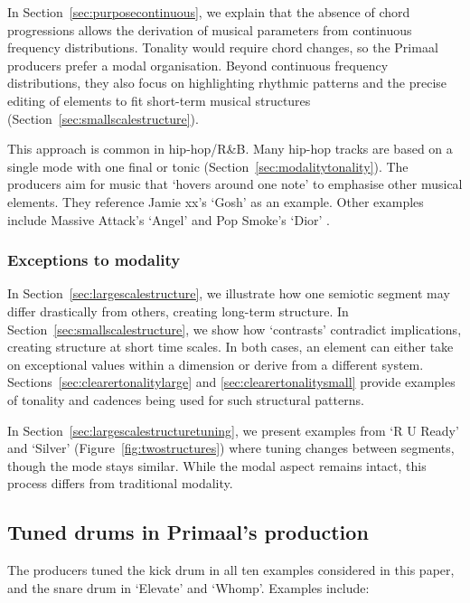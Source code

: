 \documentclass{article}
\begin{document}
In Section~\ref{sec:purposecontinuous}, we explain that the absence of chord progressions allows the derivation of musical parameters from continuous frequency distributions. Tonality would require chord changes, so the Primaal producers prefer a modal organisation. Beyond continuous frequency distributions, they also focus on highlighting rhythmic patterns and the precise editing of elements to fit short-term musical structures (Section~\ref{sec:smallscalestructure}).

This approach is common in hip-hop/R\&B. Many hip-hop tracks are based on a single mode with one final or tonic (Section~\ref{sec:modalitytonality}). The producers aim for music that `hovers around one note' to emphasise other musical elements. They reference Jamie xx's `Gosh' \citep{jamiexx2016gosh} as an example. Other examples include Massive Attack's `Angel' \citep{massiveattack1998angel} and Pop Smoke's `Dior' \citep{popsmoke2019dior}.




\subsubsection{Exceptions to modality}

In Section~\ref{sec:largescalestructure}, we illustrate how one semiotic segment may differ drastically from others, creating long-term structure. In Section~\ref{sec:smallscalestructure}, we show how `contrasts' contradict implications, creating structure at short time scales. In both cases, an element can either take on exceptional values within a dimension or derive from a different system. Sections~\ref{sec:clearertonalitylarge} and \ref{sec:clearertonalitysmall} provide examples of tonality and cadences being used for such structural patterns.

In Section~\ref{sec:largescalestructuretuning}, we present examples from `R U Ready' and `Silver' (Figure~\ref{fig:twostructures}) where tuning changes between segments, though the mode stays similar. While the modal aspect remains intact, this process differs from traditional modality.



\subsection{Tuned drums in Primaal's production}\label{sec:tuneddrums}

The producers tuned the kick drum in all ten examples considered in this paper, and the snare drum in `Elevate' and `Whomp'. Examples include:
\end{document}
